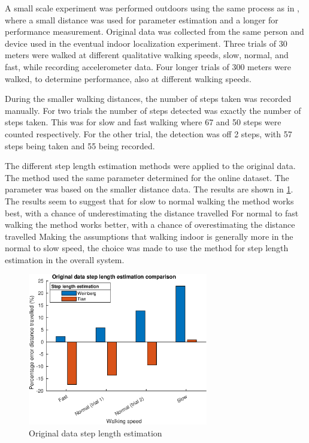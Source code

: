 A small scale experiment was performed outdoors using the same process as in \cite{Vezocnik2019}, where a small distance was used for parameter estimation and a longer for performance measurement. Original data was collected from the same person and device used in the eventual indoor localization experiment. Three trials of 30 meters were walked at different qualitative walking speeds, slow, normal, and fast, while recording accelerometer data. Four longer trials of 300 meters were walked, to determine performance, also at different walking speeds. \par 
During the smaller walking distances, the number of steps taken was recorded manually. For two trials the number of steps detected was exactly the number of steps taken. This was for slow and fast walking where 67 and 50 steps were counted respectively.  For the other trial, the detection was off 2 steps, with 57 steps being taken and 55 being recorded. \par 
The different step length estimation methods were applied to the original data. The \citet{Tian2016} method used the same parameter determined for the online dataset. The \citet{Weinberg2002} parameter was based on the smaller distance data. The results are shown in \cref{fig:step_length_personal_testing}. The results seem to suggest that for slow to normal walking the \citet{Tian2016} method works best, with a chance of underestimating the distance travelled For normal to fast walking the \citet{Weinberg2002} method works better, with a chance of overestimating the distance travelled Making the assumptions that walking indoor is generally more in the normal to slow speed, the choice was made to use the \citet{Tian2016} method for step length estimation in the overall system.
\begin{figure}[H]
	\centering
	\includegraphics[width=0.7\textwidth]{images/20201113_1920_wienberg_vs_tian_og_data_1}
	\caption{Original data step length estimation \\ }
	\label{fig:step_length_personal_testing}
\end{figure}
\newpage
